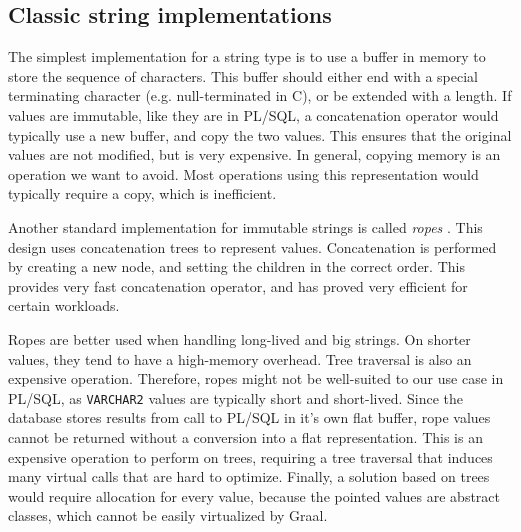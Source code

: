 \documentclass[twoside,11pt,a4paper]{article}
\newcommand{\pls}[1]{\small\texttt{#1}\normalsize}
\newcommand{\plstype}[1]{\pls{#1}}
\newcommand{\varchar}{\plstype{VARCHAR2}}
\begin{document}
\subsection{Classic string implementations}


The simplest implementation for a string type is to use a buffer in memory to store the sequence of characters. This buffer should either end with a special terminating character (e.g. null-terminated in C), or be extended with a length. If values are immutable, like they are in PL/SQL, a concatenation operator would typically use a new buffer, and copy the two values. This ensures that the original values are not modified, but is very expensive. In general, copying memory is an operation we want to avoid. Most operations using this representation would typically require a copy, which is inefficient.

Another standard implementation for immutable strings is called \textit{ropes} \cite{ropepaper}. This design uses concatenation trees to represent values. Concatenation is performed by creating a new node, and setting the children in the correct order. This provides very fast concatenation operator, and has proved very efficient for certain workloads.

Ropes are better used when handling long-lived and big strings. On shorter values, they tend to have a high-memory overhead. Tree traversal is also an expensive operation. Therefore, ropes might not be well-suited to our use case in PL/SQL, as \varchar{} values are typically short and short-lived. Since the database stores results from call to PL/SQL in it's own flat buffer, rope values cannot be returned without a conversion into a flat representation. This is an expensive operation to perform on trees, requiring a tree traversal that induces many virtual calls that are hard to optimize. Finally, a solution based on trees would require allocation for every value, because the pointed values are abstract classes, which cannot be easily virtualized by Graal.
\end{document}
